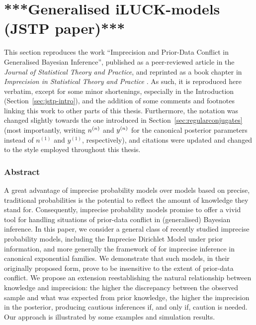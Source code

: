 \section{***Generalised iLUCK-models (JSTP paper)***}
\label{sec:jstp}


This section reproduces the work
``Imprecision and Prior-Data Conflict in Generalised Bayesian Inference'',
published as a peer-reviewed article in the \emph{Journal of Statistical Theory and Practice},
and reprinted as a book chapter in \emph{Imprecision in Statistical Theory and Practice}
\parencite{Walter2009a}.
As such, it is reproduced here verbatim,
except for some minor shortenings, especially in the Introduction (Section~\ref{sec:jstp-intro}),
and the addition of some comments and footnotes linking this work to other parts of this thesis.
Furthermore, the notation was changed slightly towards the one introduced in Section~\ref{sec:regularconjugates}
(most importantly, writing $n^{(n)}$ and $y^{(n)}$ for the canonical posterior parameters
instead of $n^{(1)}$ and $y^{(1)}$, respectively),
and citations were updated and changed to the style employed throughout this thesis.

\subsubsection*{Abstract}

A great advantage of imprecise probability models over models
based on precise, traditional probabilities is the potential to
reflect the amount of knowledge they stand for. Consequently,
imprecise probability models promise to offer a vivid tool for
handling situations of prior-data conflict in (generalised) Bayesian
inference. In this paper, we consider a general class of recently
studied imprecise probability models, including the Imprecise
Dirichlet Model \parencite[IDM,][]{1996:walley::idm} under prior information, and more generally the
framework of \textcite{2005:quaeghebeurcooman} for imprecise inference in
canonical exponential families. We demonstrate that such models, in
their originally proposed form, prove to be insensitive to the
extent of prior-data conflict. We propose an extension
reestablishing the natural relationship between knowledge and
imprecision: the higher the discrepancy between the observed sample
and what was expected from prior knowledge, the higher the
imprecision in the posterior, producing cautious inferences if, and
only if, caution is needed. Our approach is illustrated by some
examples and simulation results.

